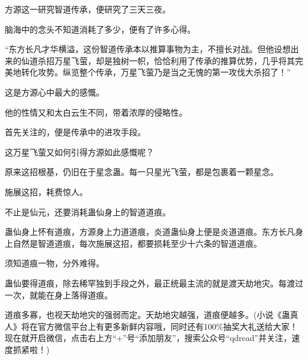 \begin{this_body}
方源这一研究智道传承，便研究了三天三夜。

脑海中的念头不知道消耗了多少，便有了许多心得。

“东方长凡才华横溢，这份智道传承本以推算事物为主，不擅长对战。但他设想出来的仙道杀招万星飞萤，却是独树一帜，恰恰利用了传承的推算优势，几乎将其完美地转化攻势。纵览整个传承，万星飞萤乃是当之无愧的第一攻伐大杀招了！”

这是方源心中最大的感慨。

他的性情又和太白云生不同，带着浓厚的侵略性。

首先关注的，便是传承中的进攻手段。

这万星飞萤又如何引得方源如此感慨呢？

原来这招根基，仍旧在于星念蛊。每一只星光飞萤，都是包裹着一颗星念。

施展这招，耗费惊人。

不止是仙元，还要消耗蛊仙身上的智道道痕。

蛊仙身上怀有道痕，方源身上力道道痕，炎道蛊仙身上便是炎道道痕。东方长凡身上自然是智道道痕，每次施展这招，都要损耗至少十六条的智道道痕。

须知道痕一物，分外难得。

蛊仙要得道痕，除去稀罕独到手段之外，最正统最主流的就是渡天劫地灾。每渡过一次，就能在身上落得道痕。

道痕多寡，也视天劫地灾的强弱而定。天劫地灾越强，道痕便越多。(小说《蛊真人》将在官方微信平台上有更多新鲜内容哦，同时还有100\%抽奖大礼送给大家！现在就开启微信，点击右上方“+”号“添加朋友”，搜索公众号“qdread”并关注，速度抓紧啦！)

\end{this_body}

